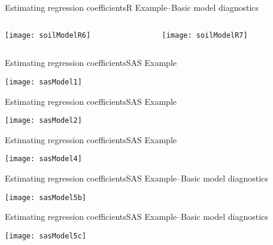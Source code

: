 \documentclass[xcolor=dvipsnames]{beamer}
\begin{document}
\begin{frame}{Estimating regression coefficients}{R Example--Basic model diagnostics}
	\begin{columns}
		\begin{column}{.35\textwidth}
			\begin{center}
				\texttt{[image: soilModelR6]}
			\end{center}
		\end{column}
		
		\begin{column}{.65\textwidth}
			\begin{center}
				\vspace{-6mm}
				\texttt{[image: soilModelR7]}
			\end{center}
		\end{column}
	\end{columns}
\end{frame}

\begin{frame}{Estimating regression coefficients}{SAS Example}
	\begin{center}
		\texttt{[image: sasModel1]}
	\end{center}
\end{frame}

\begin{frame}{Estimating regression coefficients}{SAS Example}
	\begin{center}
		\texttt{[image: sasModel2]}
	\end{center}
\end{frame}

\begin{frame}{Estimating regression coefficients}{SAS Example}
	\begin{center}
		\texttt{[image: sasModel4]}
	\end{center}
\end{frame}

\begin{frame}{Estimating regression coefficients}{SAS Example--Basic model diagnostics}
	\begin{center}
		\texttt{[image: sasModel5b]}
	\end{center}
\end{frame}

\begin{frame}{Estimating regression coefficients}{SAS Example--Basic model diagnostics}
	\begin{center}
		\texttt{[image: sasModel5c]}
	\end{center}
\end{frame}
\end{document}
